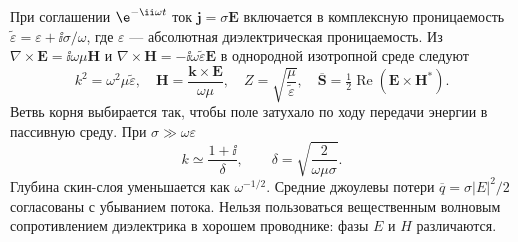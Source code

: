 
При соглашении $\e^{-\ii\omega t}$ ток $\bm j=\sigma\bm E$ включается в комплексную проницаемость $\tilde\varepsilon=\varepsilon+\ii\sigma/\omega$, где $\varepsilon$ — абсолютная диэлектрическая проницаемость. Из $\nabla\times\bm E=\ii\omega\mu\bm H$ и $\nabla\times\bm H=-\ii\omega\tilde\varepsilon\bm E$ в однородной изотропной среде следуют
\begin{equation}
 k^2=\omega^2\mu\tilde\varepsilon,\quad
 \bm H=\frac{\bm k\times\bm E}{\omega\mu},\quad
 Z=\sqrt{\frac\mu{\tilde\varepsilon}},\quad
 \overline{\bm S}=\tfrac12\operatorname{Re}(\bm E\times\bm H^*).
\end{equation}
Ветвь корня выбирается так, чтобы поле затухало по ходу передачи энергии в пассивную среду. При $\sigma\gg\omega\varepsilon$
\begin{equation}
 k\simeq\frac{1+\ii}{\delta},\qquad
 \delta=\sqrt{\frac2{\omega\mu\sigma}}.
\end{equation}
Глубина скин-слоя уменьшается как $\omega^{-1/2}$. Средние джоулевы потери $\overline q=\sigma|E|^2/2$ согласованы с убыванием потока. Нельзя пользоваться вещественным волновым сопротивлением диэлектрика в хорошем проводнике: фазы $E$ и $H$ различаются.
